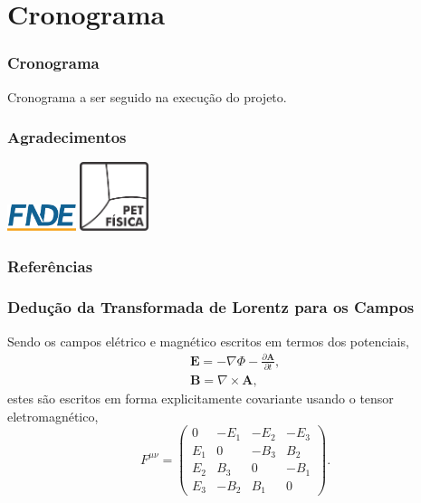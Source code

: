 \documentclass[xcolor=dvipsnames]{beamer}
\renewcommand{\vec}{\mathbf}
\begin{document}
\section{Cronograma}
\begin{frame}
	\frametitle{Cronograma}
	{ \small
	\begin{table}
		
		\caption{Cronograma a ser seguido na execução do projeto.}
	\end{table}
	}
\end{frame}

\begin{frame}
	\frametitle{Agradecimentos}
	\begin{center}
		\includegraphics[width=2cm]{./logos/logoFNDE.png}
		\hspace{2cm}
		\includegraphics[width=2cm]{./logos/logoPET.png}
	\end{center}
\end{frame}

\begin{frame}[allowframebreaks]
	\frametitle{Referências}
	
	  
\end{frame}

\appendix
\begin{frame}
	\frametitle{Dedução da Transformada de Lorentz para os Campos}
	Sendo os campos elétrico e magnético escritos em termos dos potenciais,
	\begin{gather}
		\vec{E} = - \nabla \Phi - \frac{\partial \vec{A}}{\partial t}, \\
		\vec{B} = \nabla \times \vec{A},
	\end{gather}
	estes são escritos em forma explicitamente covariante usando o tensor
	eletromagnético,
	\begin{equation}
		F^{\mu \nu} = \begin{pmatrix}
			0 & -E_1 & -E_2 & -E_3 \\
			E_1 & 0 & -B_3 & B_2 \\
			E_2 & B_3 & 0 & -B_1 \\
			E_3 & -B_2 & B_1 & 0
		\end{pmatrix}.
	\end{equation}
\end{frame}
\end{document}
